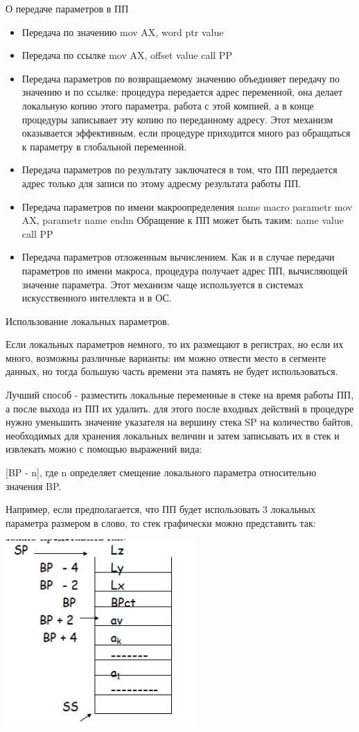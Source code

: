 О передаче параметров в ПП

\begin{itemize}
\item Передача по значению
mov AX, word ptr value
\item Передача по ссылке
mov AX, offset value
call PP
\item Передача параметров по возвращаемому значению объединяет передачу по значению и по ссылке: процедура передается адрес переменной, она делает локальную копию этого параметра, работа с этой компией, а в конце процедуры записывает эту копию по переданному адресу. Этот механизм оказывается эффективным, если процедуре приходится много раз обращаться к параметру в глобальной переменной.
\item Передача параметров по результату заключатеся в том, что ПП передается адрес только для записи по этому адресму результата работы ПП.
\item Передача параметров по имени макроопределения
name macro parametr
mov AX, parametr
name endm
Обращение к ПП может быть таким:
name value
call PP
\item Передача параметров отложенным вычислением. Как и в случае передачи параметров по имени макроса, процедура получает адрес ПП, вычисляющей значение параметра. Этот механизм чаще используется в системах искусственного интеллекта и в ОС.
\end{itemize}

Использование локальных параметров.

Если локальных параметров немного, то их размещают в регистрах, но если их много, возможны различные варианты: им можно отвести место в сегменте данных, но тогда большую часть времени эта память не будет использоваться.

Лучший способ - разместить локальные переменные в стеке на время работы ПП, а после выхода из ПП их удалить. для этого после входных действий в процедуре нужно уменьшить значение указателя на вершину стека SP на количество байтов, необходимых для хранения локальных величин и затем записывать их в стек и извлекать можно с помощью выражений вида:

[BP - n], где n определяет смещение локального параметра относительно значения BP.

Например, если предполагается, что ПП будет использовать 3 локальных параметра размером в слово, то стек графически можно представить так:

\begin{picture}[H]
\includegraphics{procstack3.png}
\end{picture}

